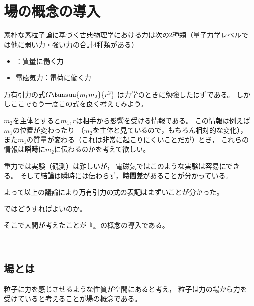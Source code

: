 \section{場の概念の導入}

素朴な素粒子論に基づく古典物理学における力は次の2種類（量子力学レベルでは他に弱い力・強い力の合計4種類がある）

\begin{itemize}
\item {}：質量に働く力%
\item 電磁気力：電荷に働く力
\end{itemize}

万有引力の式$G\bunsuu{m_1m_2}{r^2}$%
は力学のときに勉強したはずである。
しかしここでもう一度この式を良く考えてみよう。

$m_2$を主体とすると$m_1, r$は相手から影響を受ける情報である。
この情報は例えば$m_1$の位置が変わったり
（$m_2$を主体と見ているので，もちろん相対的な変化），
また$m_1$の質量が変わる（これは非常に起こりにくいことだが）とき，
これらの情報は{\bfseries 瞬時}に$m_2$に伝わるのかを考えて欲しい。

重力では実験（観測）は難しいが，
電磁気ではこのような実験は容易にできる。
そして結論は瞬時には伝わらず，{\bfseries 時間差}があることが分かっている。

よって以上の議論により万有引力の式の表記はまずいことが分かった。

ではどうすればよいのか。

そこで人間が考えたことが『』の概念の導入である。

﻿\subsection{場とは}%
粒子に力を感じさせるような性質が空間にあると考え，
粒子は力の場から力を受けていると考えることが場の概念である。


